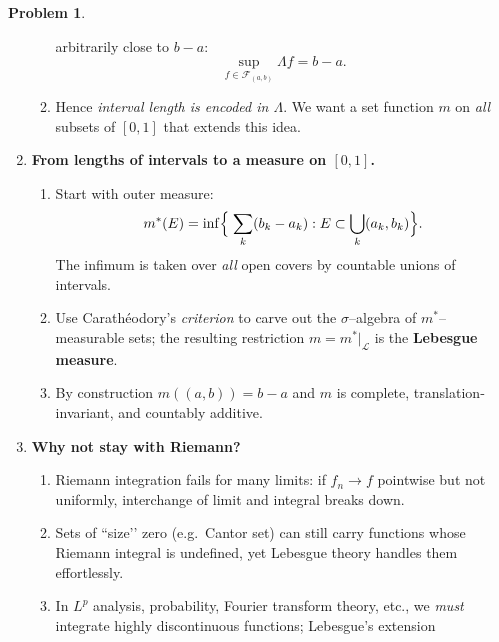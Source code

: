 \documentclass[12pt]{article}
\theoremstyle{definition} %
\newtheorem{problem}{Problem}
\theoremstyle{plain} %
\begin{document}
\begin{problem}
\begin{enumerate}
\begin{enumerate}[label=(\alph*)]
                  arbitrarily close to $b-a$:
                  \[
                      \sup_{f\in\mathcal{F}_{(a,b)}}\Lambda f=b-a.
                  \]
            \item Hence \emph{interval length is encoded in $\Lambda$}.  
                  We want a set function $m$ on \emph{all} subsets of
                  $[0,1]$ that extends this idea.
        \end{enumerate}
  \item \textbf{From lengths of intervals to a measure on \boldmath$[0,1]$.}
        \begin{enumerate}[label=(\alph*)]
            \item Start with outer measure:
                  \[
                      m^\ast(E)=\inf\Bigl\{\;\sum_{k} (b_k-a_k):
                      E\subset\bigcup_k(a_k,b_k)\Bigr\}.
                  \]
                  The infimum is taken over \emph{all} open covers by
                  countable unions of intervals.
            \item Use Carathéodory’s \emph{criterion} to carve out the
                  $\sigma$--algebra of $m^\ast$–measurable sets; the
                  resulting restriction
                  \(
                      m=m^\ast|_{\mathcal{L}}
                  \)
                  is the \textbf{Lebesgue measure}.
            \item By construction $m((a,b))=b-a$ and
                  $m$ is complete, translation‐invariant, and countably
                  additive.
        \end{enumerate}
  \item \textbf{Why not stay with Riemann?}
        \begin{enumerate}[label=(\alph*)]
            \item Riemann integration fails for many limits:
                  if $f_n\to f$ pointwise but not uniformly, 
                  interchange of limit and integral breaks down.
            \item Sets of ``size’’ zero (e.g.\ Cantor set) can still
                  carry functions whose Riemann integral is undefined,
                  yet Lebesgue theory handles them effortlessly.
            \item In $L^p$ analysis, probability, Fourier transform
                  theory, etc., we \emph{must} integrate highly
                  discontinuous functions; Lebesgue’s extension

\end{enumerate}
\end{enumerate}
\end{problem}
\end{document}
